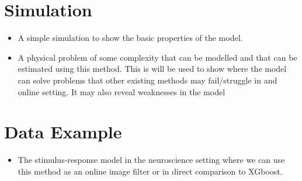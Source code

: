 \section{Simulation}
\begin{itemize}
\item A simple simulation to show the basic properties of the model.
\item A physical problem of some complexity that can be modelled and that can be estimated using this method. This is will be used to show where the model can solve problems that other existing methods may fail/struggle in and online setting. It may also reveal weaknesses in the model
\end{itemize}

\section{Data Example}
\begin{itemize}
\item The stimulus-response model in the neuroscience setting where we can use this method as an online image filter or in direct comparison to XGboost. 
\end{itemize}